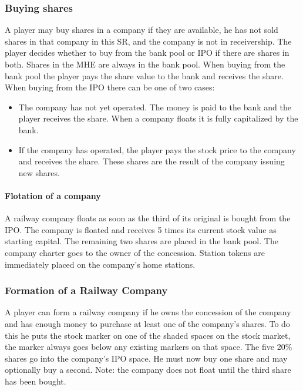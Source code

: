 \documentclass[a4paper,twocolumn]{article}
\begin{document}
\subsubsection{Buying shares}
A player may buy shares in a company if they are available, he has not sold
shares in that company in this SR, and the company is not in receivership. The
player decides whether to buy from the bank pool or IPO if there are shares in
both. Shares in the MHE are always in the bank pool. When buying from the bank
pool the player pays the share value to the bank and receives the share. When
buying from the IPO there can be one of two cases:
\begin{itemize}
	\item The company has not yet operated. The money is paid to the bank and
	the player receives the share. When a company floats it is fully
	capitalized by the bank.
	\item If the company has operated, the player pays the stock price to the
	company and receives the share. These shares are the result of the company
	issuing new shares.
\end{itemize}

\paragraph{Flotation of a company}
A railway company floats as soon as the third of its original is bought from the
IPO. The company is floated and receives 5 times its current stock value as
starting capital. The remaining two shares are placed in the bank pool. The
company charter goes to the owner of the concession. Station tokens are
immediately placed on the company's home stations.

\subsubsection{Formation of a Railway Company}
A player can form a railway company if he owns the concession of the company and
has enough money to purchase at least one of the company's shares. To do this he
puts the stock marker on one of the shaded spaces on the stock market, the
marker always goes below any existing markers on that space. The five 20\%
shares go into the company's IPO space. He must now buy one share and may
optionally buy a second. Note: the company does not float until the third share
has been bought.
\end{document}
